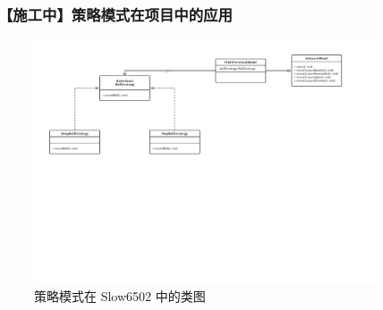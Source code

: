 \subsubsection{【施工中】策略模式在项目中的应用}

\begin{figure}[htb]
    \centering
    \includegraphics[width=0.9\textwidth]{figures/策略模式.pdf}
    \caption{策略模式在 Slow6502 中的类图}
\end{figure}